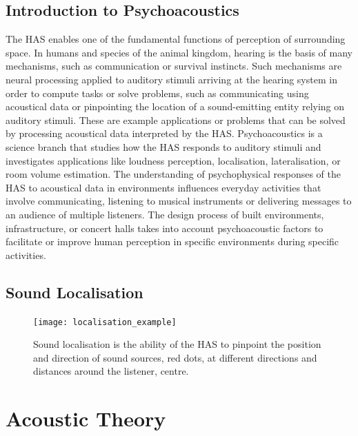 \subsection{Introduction to Psychoacoustics}
\label{sec:bg-psychoacoustics}
The HAS enables one of the fundamental functions of perception of surrounding space. In humans and species of the animal kingdom, hearing is the basis of many mechanisms, such as communication or survival instincts. Such mechanisms are neural processing applied to auditory stimuli arriving at the hearing system in order to compute tasks or solve problems, such as communicating using acoustical data or pinpointing the location of a sound-emitting entity relying on auditory stimuli. These are example applications or problems that can be solved by processing acoustical data interpreted by the HAS.
Psychoacoustics is a science branch that studies how the HAS responds to auditory stimuli and investigates applications like loudness perception, localisation, lateralisation, or room volume estimation. The understanding of psychophysical responses of the HAS to acoustical data in environments influences everyday activities that involve communicating, listening to musical instruments or delivering messages to an audience of multiple listeners. The design process of built environments, infrastructure, or concert halls takes into account psychoacoustic factors to facilitate or improve human perception in specific environments during specific activities.

\subsection{Sound Localisation}
\begin{figure}
    \centering
    \texttt{[image: localisation\_example]}
    \caption{Sound localisation is the ability of the HAS to pinpoint the position and direction of sound sources, red dots, at different directions and distances around the listener, centre.}
    \label{fig:localisation-listener}
\end{figure}

\section{Acoustic Theory}
